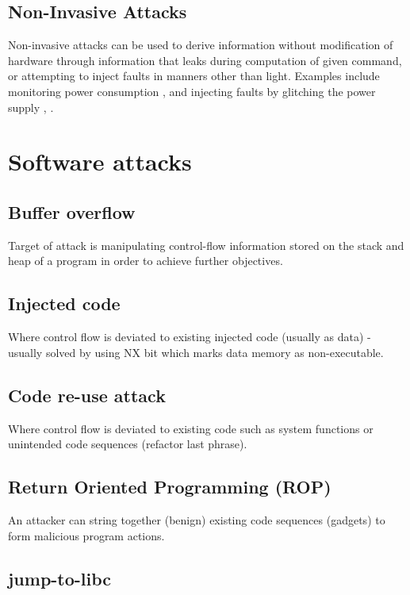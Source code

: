   
\subsection{Non-Invasive Attacks}
Non-invasive attacks can be used to derive information without modification of hardware through information that leaks during computation of given command, or attempting to inject faults in manners other than light. Examples include monitoring power consumption \cite{Maurer1999}, \cite{MangardStefan2007Paa:} and injecting faults by glitching the power supply \cite{Anderson1996}, \cite{Bar-el2006}.

\section{Software attacks}
\subsection{Buffer overflow}

Target of attack is manipulating control-flow information stored on the stack and heap of a program in order to achieve further objectives.

\subsection{Injected code}

Where control flow is deviated to existing injected code (usually as data) - usually solved by using NX bit which marks data memory as non-executable.

\subsection{Code re-use attack}
Where control flow is deviated to existing code such as system functions or unintended code sequences (refactor last phrase).

\subsection{Return Oriented Programming (ROP)}
An attacker can string together (benign) existing code sequences (gadgets) to form malicious program actions.

\subsection{jump-to-libc}
